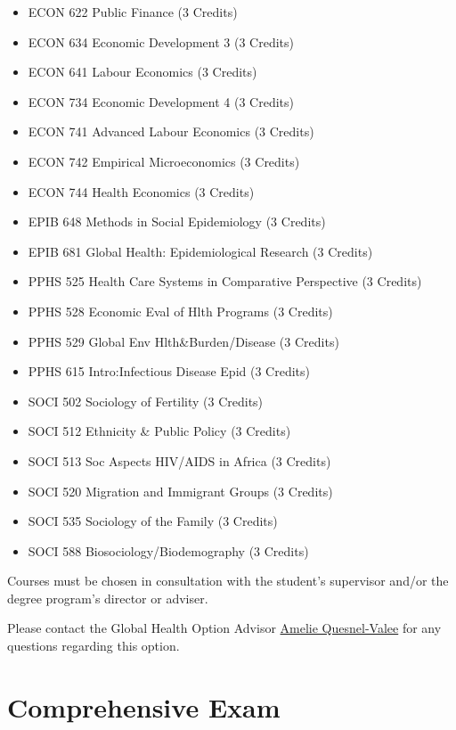 \documentclass[
  openany]{book}
\providecommand{\tightlist}{%
  \setlength{\itemsep}{0pt}\setlength{\parskip}{0pt}}
\begin{document}
\begin{itemize}
\tightlist
\item
  ECON 622 Public Finance (3 Credits)
\item
  ECON 634 Economic Development 3 (3 Credits)
\item
  ECON 641 Labour Economics (3 Credits)
\item
  ECON 734 Economic Development 4 (3 Credits)
\item
  ECON 741 Advanced Labour Economics (3 Credits)
\item
  ECON 742 Empirical Microeconomics (3 Credits)
\item
  ECON 744 Health Economics (3 Credits)
\item
  EPIB 648 Methods in Social Epidemiology (3 Credits)
\item
  EPIB 681 Global Health: Epidemiological Research (3 Credits)
\item
  PPHS 525 Health Care Systems in Comparative Perspective (3 Credits)
\item
  PPHS 528 Economic Eval of Hlth Programs (3 Credits)
\item
  PPHS 529 Global Env Hlth\&Burden/Disease (3 Credits)
\item
  PPHS 615 Intro:Infectious Disease Epid (3 Credits)
\item
  SOCI 502 Sociology of Fertility (3 Credits)
\item
  SOCI 512 Ethnicity \& Public Policy (3 Credits)
\item
  SOCI 513 Soc Aspects HIV/AIDS in Africa (3 Credits)
\item
  SOCI 520 Migration and Immigrant Groups (3 Credits)
\item
  SOCI 535 Sociology of the Family (3 Credits)
\item
  SOCI 588 Biosociology/Biodemography (3 Credits)
\end{itemize}

Courses must be chosen in consultation with the student's supervisor and/or the degree program's director or adviser.

Please contact the Global Health Option Advisor \href{mailto:amelie.quesnelvallee@mcgill.ca}{Amelie Quesnel-Valee} for any questions regarding this option.

\hypertarget{comprehensive-exam}{%
\chapter{Comprehensive Exam}\label{comprehensive-exam}}
\end{document}
